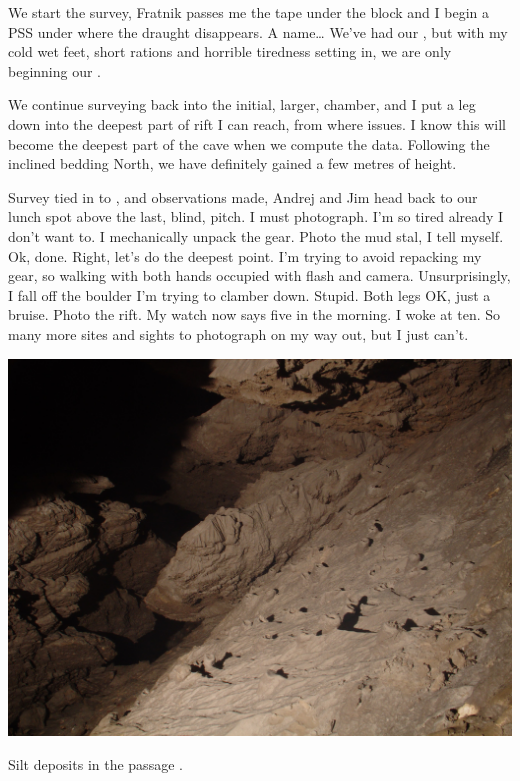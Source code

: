 We start the survey, Fratnik passes me the tape under the block and I
begin a PSS under where the draught disappears. A name\ldots{} We've had
our , but with my cold wet feet, short rations and
horrible tiredness setting in, we are only beginning our .

We continue surveying back into the initial, larger, chamber, and I put
a leg down into the deepest part of rift I can reach, from where  issues. I know this will become the
deepest part of the cave when we compute the data. Following the
inclined bedding North, we have definitely gained a few metres of
height.

Survey tied in to , and observations made, Andrej
and Jim head back to our lunch spot above the last, blind, pitch. I must
photograph. I'm so tired already I don't want to. I mechanically unpack
the gear. Photo the mud stal, I tell myself. Ok, done. Right, let's do
the deepest point. I'm trying to avoid repacking my gear, so walking
with both hands occupied with flash and camera. Unsurprisingly, I fall
off the boulder I'm trying to clamber down. Stupid. Both legs OK, just a
bruise. Photo the rift. My watch now says five in the morning. I woke at
ten. So many more sites and sights to photograph on my way out, but I
just can't.

\begin{pagefigure}
\checkoddpage \ifoddpage \forcerectofloat \else \forceversofloat \fi
   \centering
\includegraphics[width = \textwidth]{2011/winter_journey/2011-08-05-03.13.20-Jarvist Frost-CanonG5-CRW_0127 - Silt deposits in Chamber just before bottom Winters Journey--orig.jpg}
\caption{Silt deposits in the passage . } \label{silt winter}
\end{pagefigure}

